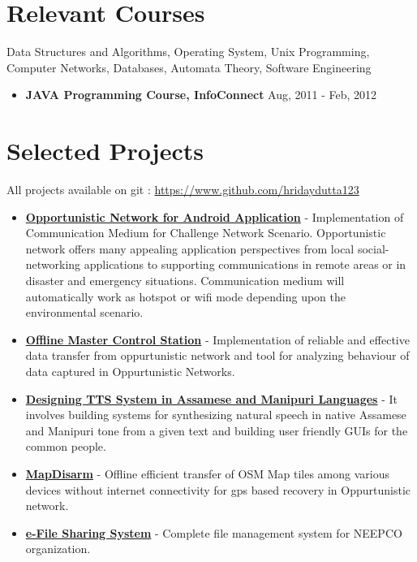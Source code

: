 \documentclass[margin, centered]{res}
\begin{document}
\begin{resume}
\section{Relevant \hspace{2mm} Courses}
Data Structures and Algorithms, Operating System, Unix Programming, Computer Networks, Databases, Automata Theory, Software Engineering
\begin{itemize}[leftmargin=*]
\item \textbf{JAVA Programming Course, InfoConnect} \hfill Aug, 2011 - Feb, 2012 \\
\end{itemize}
\section{Selected Projects}
All projects available on git : \url{https://www.github.com/hridaydutta123}
\begin{itemize}[leftmargin=*]
 \item \textbf{\href{https://github.com/Bug-Assassins/DFC_query_builder}{Opportunistic Network for Android Application}} - Implementation of Communication Medium for Challenge Network Scenario. Opportunistic network offers many appealing application perspectives from local social-networking applications to supporting communications in remote areas or in disaster and emergency situations. Communication medium will automatically work as hotspot or wifi mode depending upon the environmental scenario.
 \item \textbf{\href{http://www.github.com/hridaydutta123/offlinemcs}{Offline Master Control Station}} - Implementation of reliable and effective data transfer from oppurtunistic network and tool for analyzing behaviour of data captured in Oppurtunistic Networks.
 \item \textbf{\href{http://www.iitg.ernet.in/cseweb/tts/tts/Assamese/}{Designing TTS System in Assamese and Manipuri Languages}} - It involves building systems for synthesizing natural speech in native Assamese and Manipuri tone from a 	given text and building user friendly GUIs for the common people.
 \item \textbf{\href{https://github.com/hridaydutta123/MapDisarm}{MapDisarm}} - Offline efficient transfer of OSM Map tiles among various devices without internet connectivity for gps based recovery in Oppurtunistic network.
 \item \textbf{\href{https://github.com/hridaydutta123/MapDisarm}{e-File Sharing System}} - Complete file management system for NEEPCO organization.
\end{itemize}


\end{resume}
\end{document}
